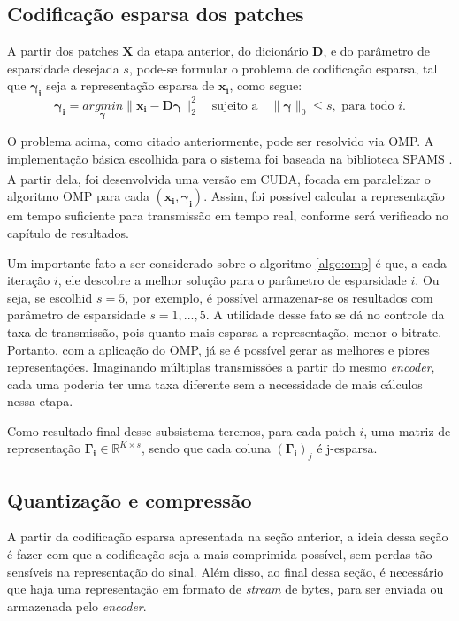 \documentclass[cic,tc]{iiufrgs}
\renewcommand{\vec}[1]{\bm{#1}}
\newcommand{\mat}[1]{\bm{#1}}
\newcommand{\reg}{\textsuperscript{\textregistered}}
\begin{document}
\subsection{Codificação esparsa dos patches}
A partir dos patches $\mat{X}$ da etapa anterior, do dicionário $\mat{D}$, e do parâmetro 
de esparsidade desejada $s$, pode-se formular o problema de codificação esparsa, tal que 
$\vec{\gamma_i}$ seja a representação esparsa de $\vec{x_i}$, como segue:
\begin{equation}
    \vec{\gamma_i} = \underset{\vec{\gamma}}{argmin} \lVert \vec{x_i} - \mat{D}\vec{\gamma} \rVert_2^2
    \hspace{1em} \text{sujeito a} \hspace{1em}
    \lVert \vec{\gamma} \rVert_0 \le s,
    \text{ para todo } i.
\end{equation}

O problema acima, como citado anteriormente, pode ser resolvido via OMP.
A implementação básica escolhida para o sistema foi baseada na biblioteca SPAMS \cite{SPAMS}.
A partir dela, foi desenvolvida uma versão em CUDA\reg, focada em paralelizar o algoritmo
OMP para cada $(\vec{x_i}, \vec{\gamma_i})$. Assim, foi possível calcular a representação
em tempo suficiente para transmissão em tempo real, conforme será verificado no capítulo 
de resultados.

Um importante fato a ser considerado sobre o algoritmo \autoref{algo:omp} é que, a cada iteração $i$,
ele descobre a melhor solução para o parâmetro de esparsidade $i$. Ou seja, se escolhid $s=5$,
por exemplo, é possível armazenar-se os resultados com parâmetro de esparsidade $s=1,...,5$. 
A utilidade desse fato se dá no controle da taxa de transmissão, pois quanto mais esparsa a 
representação, menor o bitrate. 
Portanto, com a aplicação do OMP, já se é possível gerar as melhores e piores representações.
Imaginando múltiplas transmissões a partir do mesmo \textit{encoder}, cada uma poderia ter 
uma taxa diferente sem a necessidade de mais cálculos nessa etapa.

Como resultado final desse subsistema teremos, para cada patch $i$, uma matriz de representação
$\mat{\Gamma_i} \in \mathbb{R}^{K \times s}$, sendo que cada coluna $(\mat{\Gamma_i})_j$ é 
j-esparsa.

\subsection{Quantização e compressão}
A partir da codificação esparsa apresentada na seção anterior, a ideia dessa seção é 
fazer com que a codificação seja a mais comprimida possível, sem perdas tão sensíveis
na representação do sinal.
Além disso, ao final dessa seção, é necessário que haja uma representação em formato de 
\textit{stream} de bytes, para ser enviada ou armazenada pelo \textit{encoder}.
\end{document}
